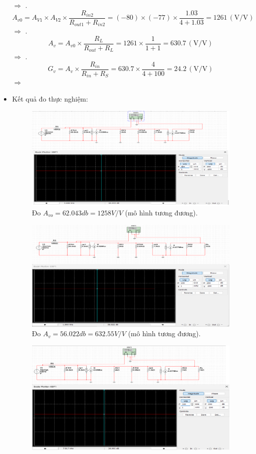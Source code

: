 \begin{itemize}[label=-]
	$\Rightarrow$ .
	\[
	A_{v0} = A_{V1} \times A_{V2} \times
	\frac{R_{in2}}{R_{out1} + R_{in2}}
	= (-80) \times (-77) \times
	\frac{1.03}{4 + 1.03}
	= 1261\,(\text{V/V})
	\]
	$\Rightarrow$ .
	\[
	A_v = A_{v0} \times
	\frac{R_L}{R_{out} + R_L}
	= 1261 \times
	\frac{1}{1 + 1}
	= 630.7\,(\text{V/V})
	\]
	$\Rightarrow$ .
	\[
	G_v = A_v \times
	\frac{R_{in}}{R_{in} + R_S}
	= 630.7 \times
	\frac{4}{4 + 100}
	= 24.2\,(\text{V/V})
	\]
	$\Rightarrow$ 
	\item Kết quả đo thực nghiệm:
	\begin{figure}[H]
		\centering
		\includegraphics[width=.8\linewidth]{./my-chapters/my-images/Question10/b_ketqua_0.png}
		\caption{Đo $A_{vo} = 62.043db = 1258 V/V$ (mô hình tương đương).}
	\end{figure}
	\begin{figure}[H]
		\centering
		\includegraphics[width=.8\linewidth]{./my-chapters/my-images/Question10/b_ketqua_1.png}
		\caption{Đo $A_{v} = 56 .022 db =  632.55 V/V$ (mô hình tương đương).}
	\end{figure}
	\begin{figure}[H]
		\centering
		\includegraphics[width=.8\linewidth]{./my-chapters/my-images/Question10/b_ketqua_2.png}

\end{figure}
\end{itemize}

